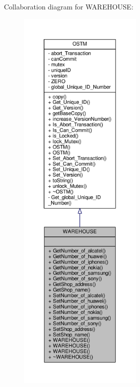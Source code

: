 Collaboration diagram for W\+A\+R\+E\+H\+O\+U\+SE\+:\nopagebreak
\begin{figure}[H]
\begin{center}
\leavevmode
\includegraphics[height=550pt]{class_w_a_r_e_h_o_u_s_e__coll__graph}
\end{center}
\end{figure}
